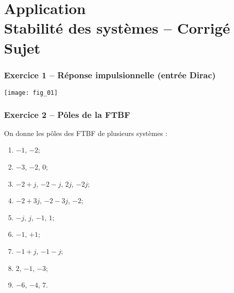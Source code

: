 \chapter*{Application  \\ 
Stabilité des systèmes -- \ifprof Corrigé \else Sujet \fi}

\iflivret {} \else
\ifprof  {} \else \fi
\fi

\setcounter{question}{0}


\subsection*{Exercice 1 -- Réponse impulsionnelle (entrée Dirac)}

\ifprof
\else
\begin{center}
\texttt{[image: fig\_01]}
\end{center}
\fi

\subsection*{Exercice 2 -- Pôles de la FTBF}
\setcounter{question}{0}
\ifprof
\else
On donne les pôles des FTBF de plusieurs systèmes :
\begin{multicols}{3}
\begin{enumerate}
\item $-1$, $-2$;
\item $-3$, $-2$, $0$;
\item $-2+j$, $-2-j$, $2j$, $-2j$;
\item $-2+3j$, $-2-3j$, $-2$;
\item $-j$, $j$, $-1$, $1$;
\item $-1$, $+1$;
\item $-1+j$, $-1-j$;
\item $2$, $-1$, $-3$;
\item $-6$, $-4$, $7$.
\end{enumerate}
\end{multicols}
\fi
{}





